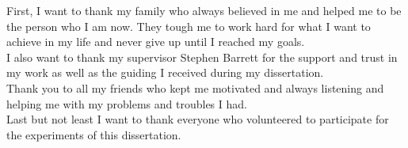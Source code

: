 \documentclass[a4paper, 12pt, oneside]{report}    	%
\begin{document}
\thesistitlepage                                  		%
\thesisdeclarationpage									%
\thesispermissionpage									%

\begin{thesisacknowledgments}               	%
First, I want to thank my family who always believed in me and helped me to be the person who I am now. 
They tough me to work hard for what I want to achieve in my life and never give up until I reached my goals. \\
I also want to thank my supervisor Stephen Barrett for the support and trust in my work as well as the guiding I received during my dissertation. \\
Thank you to all my friends who kept me motivated and always listening and helping me with my problems and troubles I had. \\
Last but not least I want to thank everyone who volunteered to participate for the experiments of this dissertation. 

\end{thesisacknowledgments}                   %

\begin{thesisabstract}
      
\end{thesisabstract}

\tableofcontents 
\listoftables                                     			%
\listoffigures                                    			%

                                
                            






\begin{appendix}




\end{appendix}




\end{document}
